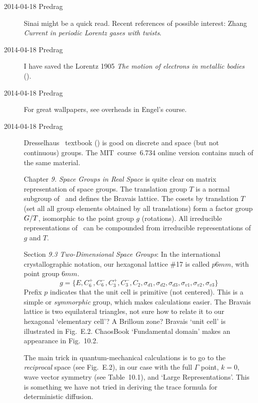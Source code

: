 \documentclass[pre,preprint,groupedaddress,showpacs,showkeys]{revtex4}
\begin{document}
\begin{description}
\item[2014-04-18 Predrag]
Sinai might be a quick read.
Recent references of possible interest:
Zhang
{\em Current in periodic {Lorentz} gases with twists}.

\item[2014-04-18 Predrag]
I have saved the Lorentz 1905
{\em The motion of electrons in metallic bodies}
().

\item[2014-04-18 Predrag]
For great wallpapers, see overheads in
{Engel's} course.

\item[2014-04-18 Predrag]
Dresselhaus \etal\ textbook
()
is good on discrete
and space (but not continuous) groups.
The MIT~course~6.734
{online version} contains much of the same material.

Chapter {\em 9. Space Groups in Real Space} is quite clear on matrix
representation of space groups. The translation group $T$ is a normal
subgroup of \Group\ and defines the Bravais lattice. The cosets by
translation $T$ (set all all group elements obtained by all translations)
form a factor group $G/T$, isomorphic to the point group $g$
(rotations). All irreducible representations of \Group\ can be compounded
from irreducible representations of $g$ and $T$.

Section {\em 9.3 Two-Dimensional Space Groups}: In the international
crystallographic notation, our hexagonal lattice \#17 is called $p6mm$,
with point group $6mm$.
\[
g = \{
E, C_6^+, C_6^-, C_3^+, C_3^-, C_2,
\sigma_{d1}, \sigma_{d2}, \sigma_{d3},
\sigma_{v1},\sigma_{v2}, \sigma_{v3}
\}
\]
Prefix $p$ indicates that the unit cell is primitive (not centered). This
is a simple or {\em symmorphic} group, which makes calculations easier.
The Bravais lattice is two equilateral triangles, not sure how to relate
it to our hexagonal `elementary cell'? A Brilloun zone? Bravais `unit cell'
is illustrated in Fig.~E.2. ChaosBook `Fundamental
domain' makes an appearance in Fig.~10.2.

The main trick in quantum-mechanical calculations is to go to the
\emph{reciprocal} space (see Fig.~E.2), in our case with the full
$\Gamma$ point, $k=0$, wave vector symmetry (see Table~10.1), and `Large
Representations'. This is something we have not tried in deriving the
trace formula for deterministic diffusion.


\end{description}
\end{document}
